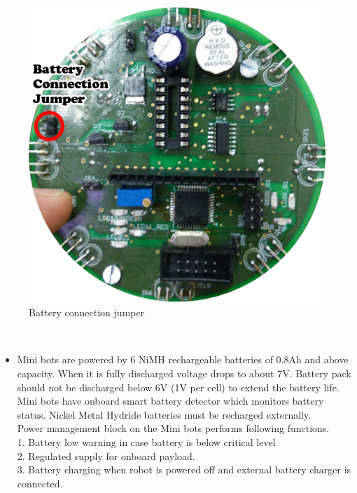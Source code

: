 \documentclass[a4paper,12pt,oneside]{book}
\begin{document}
	\hfill\\
	\begin{figure}[h!]
		\caption{Battery connection jumper}
		\includegraphics[width=\textwidth]{./HardwareManual/BatteryIndication.jpg}
	\end{figure}
	\hfill\\	
	
	\begin{itemize}
	\item {Mini bots are powered by 6 NiMH rechargeable batteries of 0.8Ah and above capacity. When it is
	fully discharged voltage drops to about 7V. Battery pack should not be discharged below 6V (1V
	per cell) to extend the battery life. Mini bots have onboard smart battery detector which monitors
	battery status. Nickel Metal Hydride batteries must be recharged externally.\\
	Power management block on the Mini bots performs following functions.\\
	1. Battery low warning in case battery is below critical level\\
	2. Regulated supply for onboard payload.\\
	3. Battery charging when robot is powered off and external battery charger is
	connected.\\}
	\end{itemize}
	\hfill\\	
	
\end{document}
